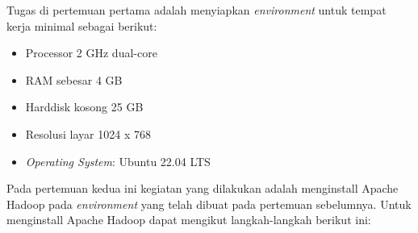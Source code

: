\documentclass[a4paper]{tufte-handout}
\begin{document}
Tugas di pertemuan pertama adalah menyiapkan \textit{environment} untuk tempat kerja minimal sebagai berikut:
\begin{multicols}{2}
\begin{itemize}
\setlength\itemsep{0em}
\item Processor 2 GHz dual-core
\item RAM sebesar 4 GB
\item Harddisk kosong 25 GB
\item Resolusi layar 1024 x 768
\item \textit{Operating System}: Ubuntu 22.04 LTS
\end{itemize}
\end{multicols}
\hrulefill

\clearpage
{}


Pada pertemuan kedua ini kegiatan yang dilakukan adalah menginstall Apache Hadoop pada \textit{environment} yang telah dibuat pada pertemuan sebelumnya. Untuk menginstall Apache Hadoop dapat mengikut langkah-langkah berikut ini:
\end{document}
